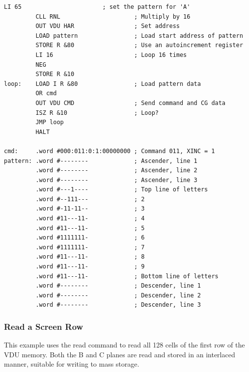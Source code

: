 \begin{lstlisting}[language=cftasm]
         LI 65                       ; set the pattern for 'A'
         CLL RNL                     ; Multiply by 16
         OUT VDU HAR                 ; Set address
         LOAD pattern                ; Load start address of pattern
         STORE R &80                 ; Use an autoincrement register
         LI 16                       ; Loop 16 times
         NEG
         STORE R &10
loop:    LOAD I R &80                ; Load pattern data
         OR cmd
         OUT VDU CMD                 ; Send command and CG data
         ISZ R &10                   ; Loop?
         JMP loop
         HALT

cmd:     .word #000:011:0:1:00000000 ; Command 011, XINC = 1
pattern: .word #--------             ; Ascender, line 1
         .word #--------             ; Ascender, line 2
         .word #--------             ; Ascender, line 3
         .word #---1----             ; Top line of letters
         .word #--111---             ; 2
         .word #-11-11--             ; 3
         .word #11---11-             ; 4
         .word #11---11-             ; 5
         .word #1111111-             ; 6
         .word #1111111-             ; 7
         .word #11---11-             ; 8
         .word #11---11-             ; 9
         .word #11---11-             ; Bottom line of letters
         .word #--------             ; Descender, line 1
         .word #--------             ; Descender, line 2
         .word #--------             ; Descender, line 3
\end{lstlisting}





\subsubsection{Read a Screen Row}

This example uses the read command to read all 128 cells of the first row of
the VDU memory. Both the B and C planes are read and stored in an interlaced
manner, suitable for writing to mass storage.

